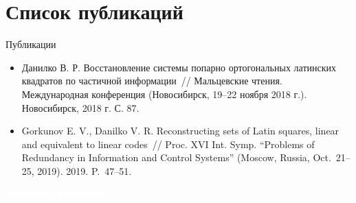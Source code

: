 \documentclass[8pt, hyperref={pdftex,unicode}, green]{beamer}
\begin{document}
\section{Список публикаций}
\begin{frame}{Публикации}

    \begin{block}{}
        \begin{itemize}
            \item Данилко В. Р. Восстановление системы попарно ортогональных латинских квадратов по частичной информации~// Мальцевские чтения. Международная конференция (Новосибирск, 19--22 ноября 2018 г.). Новосибирск, 2018 г. С. 87.
            \item Gorkunov E. V., Danilko V. R. Reconstructing sets of Latin squares, linear and equivalent to linear codes~//
            Proc. XVI Int. Symp. ``Problems of Redundancy in Information and Control Systems'' (Moscow, Russia, Oct.~21--25, 2019). 2019. P.~47--51.
        \end{itemize}
    \end{block}
  
\end{frame} 


\begin{frame}[standout]
    
    \Huge\centering
    \textcolor{white}{\bf Спасибо за внимание!}
  
\end{frame} 
\end{document}
